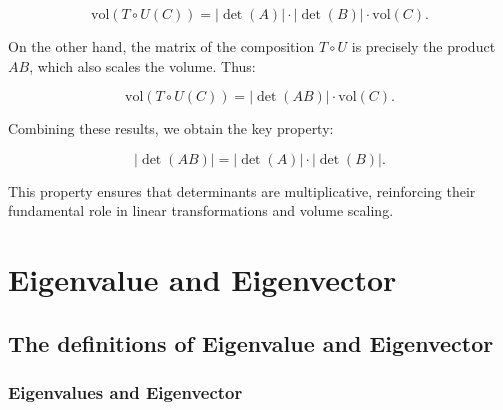 \documentclass[a4paper,12pt]{article}
\begin{document}
\[
\text{vol}(T \circ U(C)) = |\det(A)| \cdot |\det(B)| \cdot \text{vol}(C).
\]

On the other hand, the matrix of the composition \( T \circ U \) is precisely the product \( AB \), which also scales the volume. Thus:

\[
\text{vol}(T \circ U(C)) = |\det(AB)| \cdot \text{vol}(C).
\]

Combining these results, we obtain the key property:

\[
|\det(AB)| = |\det(A)| \cdot |\det(B)|.
\]

This property ensures that determinants are multiplicative, reinforcing their fundamental role in linear transformations and volume scaling.


\newpage
\Large \section{Eigenvalue and Eigenvector}
\large \subsection{The definitions of Eigenvalue and Eigenvector}
\small \subsubsection{Eigenvalues and Eigenvector}
\end{document}
